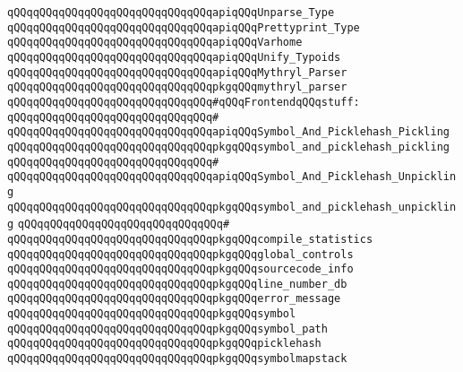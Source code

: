 \verb|qQQqqQQqqQQqqQQqqQQqqQQqqQQqqQQqapiqQQqUnparse_Type|\newline
\verb|qQQqqQQqqQQqqQQqqQQqqQQqqQQqqQQqapiqQQqPrettyprint_Type|\newline
\verb|qQQqqQQqqQQqqQQqqQQqqQQqqQQqqQQqapiqQQqVarhome|\newline
\verb|qQQqqQQqqQQqqQQqqQQqqQQqqQQqqQQqapiqQQqUnify_Typoids|\newline
\newline
\verb|qQQqqQQqqQQqqQQqqQQqqQQqqQQqqQQqapiqQQqMythryl_Parser|\newline
\verb|qQQqqQQqqQQqqQQqqQQqqQQqqQQqqQQqpkgqQQqmythryl_parser|\newline
\newline
\newline
\newline
\verb|qQQqqQQqqQQqqQQqqQQqqQQqqQQqqQQq#qQQqFrontendqQQqstuff:|\newline
\verb|qQQqqQQqqQQqqQQqqQQqqQQqqQQqqQQq#|\newline
\verb|qQQqqQQqqQQqqQQqqQQqqQQqqQQqqQQqapiqQQqSymbol_And_Picklehash_Pickling|\newline
\verb|qQQqqQQqqQQqqQQqqQQqqQQqqQQqqQQqpkgqQQqsymbol_and_picklehash_pickling|\newline
\verb|qQQqqQQqqQQqqQQqqQQqqQQqqQQqqQQq#|\newline
\verb|qQQqqQQqqQQqqQQqqQQqqQQqqQQqqQQqapiqQQqSymbol_And_Picklehash_Unpickling|\newline
\verb|qQQqqQQqqQQqqQQqqQQqqQQqqQQqqQQqpkgqQQqsymbol_and_picklehash_unpickling|\newline
\verb|qQQqqQQqqQQqqQQqqQQqqQQqqQQqqQQq#|\newline
\verb|qQQqqQQqqQQqqQQqqQQqqQQqqQQqqQQqpkgqQQqcompile_statistics|\newline
\verb|qQQqqQQqqQQqqQQqqQQqqQQqqQQqqQQqpkgqQQqglobal_controls|\newline
\verb|qQQqqQQqqQQqqQQqqQQqqQQqqQQqqQQqpkgqQQqsourcecode_info|\newline
\verb|qQQqqQQqqQQqqQQqqQQqqQQqqQQqqQQqpkgqQQqline_number_db|\newline
\verb|qQQqqQQqqQQqqQQqqQQqqQQqqQQqqQQqpkgqQQqerror_message|\newline
\verb|qQQqqQQqqQQqqQQqqQQqqQQqqQQqqQQqpkgqQQqsymbol|\newline
\verb|qQQqqQQqqQQqqQQqqQQqqQQqqQQqqQQqpkgqQQqsymbol_path|\newline
\verb|qQQqqQQqqQQqqQQqqQQqqQQqqQQqqQQqpkgqQQqpicklehash|\newline
\verb|qQQqqQQqqQQqqQQqqQQqqQQqqQQqqQQqpkgqQQqsymbolmapstack|\newline
